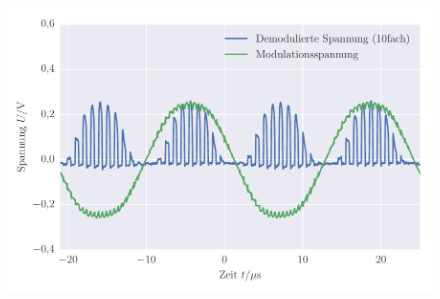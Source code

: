 
\FloatBarrier\begin{figure}[!h]
\centering
\includegraphics[scale=1]{../Grafiken/Amplituden_Modulation_Diode_Demodulation_Gleichrichter.pdf}
\caption{\label{fig:amplituden_modulation_diode_demodulation_gleichrichter}}
\end{figure}
\FloatBarrier